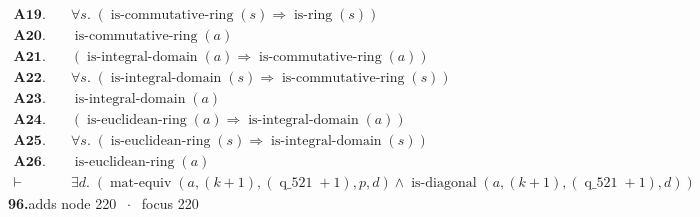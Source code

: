 \documentclass[11pt]{article}
\theoremstyle{plain}
\newcommand{\fit}[1]{\resizebox{\ifdim\width>\linewidth\linewidth\else\width\fi}{!}{#1}}
\begin{document}
\begin{align*}
  \mathbf{A19.}\quad & \forall s.\; (\operatorname{is\text{-}commutative\text{-}ring}(s) \Rightarrow \operatorname{is\text{-}ring}(s)) \\
  \mathbf{A20.}\quad & \operatorname{is\text{-}commutative\text{-}ring}(a) \\
  \mathbf{A21.}\quad & (\operatorname{is\text{-}integral\text{-}domain}(a) \Rightarrow \operatorname{is\text{-}commutative\text{-}ring}(a)) \\
  \mathbf{A22.}\quad & \forall s.\; (\operatorname{is\text{-}integral\text{-}domain}(s) \Rightarrow \operatorname{is\text{-}commutative\text{-}ring}(s)) \\
  \mathbf{A23.}\quad & \operatorname{is\text{-}integral\text{-}domain}(a) \\
  \mathbf{A24.}\quad & (\operatorname{is\text{-}euclidean\text{-}ring}(a) \Rightarrow \operatorname{is\text{-}integral\text{-}domain}(a)) \\
  \mathbf{A25.}\quad & \forall s.\; (\operatorname{is\text{-}euclidean\text{-}ring}(s) \Rightarrow \operatorname{is\text{-}integral\text{-}domain}(s)) \\
  \mathbf{A26.}\quad & \operatorname{is\text{-}euclidean\text{-}ring}(a) \\
  \vdash\quad & \exists d.\; (\operatorname{mat\text{-}equiv}(a, (k + 1), (\operatorname{q\_521} + 1), p, d) \wedge \operatorname{is\text{-}diagonal}(a, (k + 1), (\operatorname{q\_521} + 1), d))
\end{align*}
\medskip\noindent\textbf{96.}\quad \fit{\texttt{(ew 'p)}}\hfill{\small adds node 220 $\;\cdot\;$ focus 220}\\[2pt]
\end{document}
